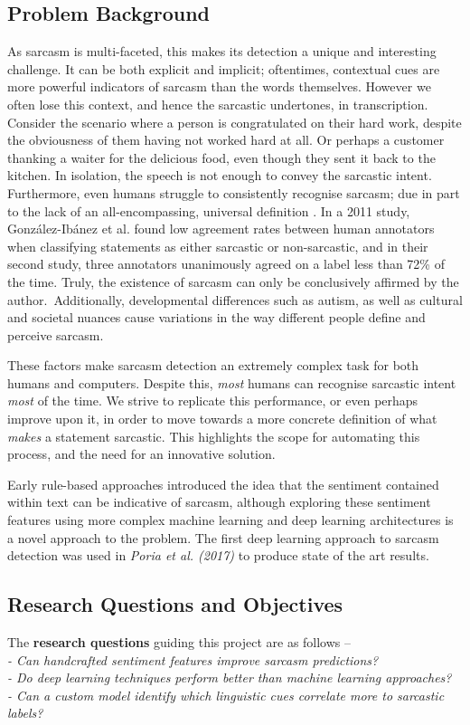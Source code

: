\documentclass[12pt,a4paper]{article}
\begin{document}
\subsection{Problem Background}
\noindent As sarcasm is multi-faceted, this makes its detection a unique and interesting challenge. It can be both explicit and implicit; oftentimes, contextual cues are more powerful indicators of sarcasm than the words themselves. However we often lose this context, and hence the sarcastic undertones, in transcription. Consider the scenario where a person is congratulated on their hard work, despite the obviousness of them having not worked hard at all. Or perhaps a customer thanking a waiter for the delicious food, even though they sent it back to the kitchen. In isolation, the speech is not enough to convey the sarcastic intent. Furthermore, even humans struggle to consistently recognise sarcasm; due in part to the lack of an all-encompassing, universal definition
. In a 2011 study, Gonz{\'a}lez-Ib{\'a}nez et al. \cite{gonzalez2011identifying} found low agreement rates between human annotators when classifying statements as either sarcastic or non-sarcastic, and in their second study, three annotators unanimously agreed on a label less than 72\% of the time. Truly, the existence of sarcasm can only be conclusively affirmed by the author.\ Additionally, developmental differences such as autism, as well as cultural and societal nuances cause variations in the way different people define and perceive sarcasm.

These factors make sarcasm detection an extremely complex task for both humans and computers. Despite this, \textit{most} humans can recognise sarcastic intent \textit{most} of the time. We strive to replicate this performance, or even perhaps improve upon it, in order to move towards a more concrete definition of what \textit{makes} a statement sarcastic. This highlights the scope for automating this process, and the need for an innovative solution.

Early rule-based approaches introduced the idea that the sentiment contained within text can be indicative of sarcasm, although exploring these sentiment features using more complex machine learning and deep learning architectures is a novel approach to the problem. The first deep learning approach to sarcasm detection was used in \textit{Poria et al. (2017)} \cite{poria2016deeper} to produce state of the art results. 

\subsection{Research Questions and Objectives}
\noindent The \textbf{research questions} guiding this project are as follows --\\
\indent \textit{- Can handcrafted sentiment features improve sarcasm predictions?}\\ 
\indent \textit{- Do deep learning techniques perform better than machine learning approaches?}\\ 
\indent \textit{- Can a custom model identify which linguistic cues correlate more to sarcastic labels?}\\
\end{document}
